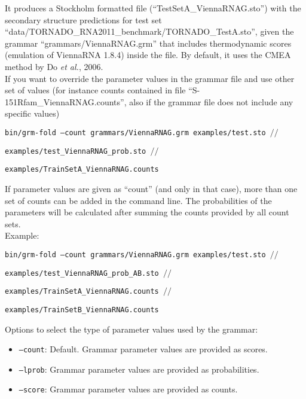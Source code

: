\noindent
It produces a Stockholm formatted file (``TestSetA\_ViennaRNAG.sto'')
with the secondary structure predictions for test set
``data/TORNADO\_RNA2011\_benchmark/TORNADO\_TestA.sto'', given the grammar
``grammars/ViennaRNAG.grm'' that includes thermodynamic scores
(emulation of ViennaRNA 1.8.4) inside the file. By default, it uses
the CMEA method by Do \textsl{et al.}, 2006.\\

\noindent
If you want to override the parameter values in the grammar file and
use other set of values (for instance counts contained in file
``S-151Rfam\_ViennaRNAG.counts'', also if the grammar file does not
include any specific values)\\

\begin{footnotesize}
 \texttt{bin/grm-fold --count grammars/ViennaRNAG.grm examples/test.sto $//$}

 \hspace{15mm}\texttt{examples/test\_ViennaRNAG\_prob.sto $//$}
 
\hspace{15mm}\texttt{examples/TrainSetA\_ViennaRNAG.counts}\\
\end{footnotesize}

\noindent
If parameter values are given as ``count'' (and only in that case),
more than one set of counts can be added in the command line. The
probabilities of the parameters will be calculated after summing the
counts provided by all count sets.\\

\noindent
Example:\\

\begin{footnotesize}
 \texttt{bin/grm-fold --count grammars/ViennaRNAG.grm examples/test.sto $//$}

 \hspace{15mm}\texttt{examples/test\_ViennaRNAG\_prob\_AB.sto $//$}
 
\hspace{15mm}\texttt{examples/TrainSetA\_ViennaRNAG.counts $//$}

\hspace{15mm}\texttt{examples/TrainSetB\_ViennaRNAG.counts}\\
\end{footnotesize}

\noindent
Options to select the type of parameter values used by the grammar:
\begin{itemize}
\item \texttt{--count}:  Default. Grammar parameter values are provided as scores.
\item \texttt{--lprob}:  Grammar parameter values are provided as probabilities.
\item \texttt{--score}:  Grammar parameter values are provided as counts.
\end{itemize}

